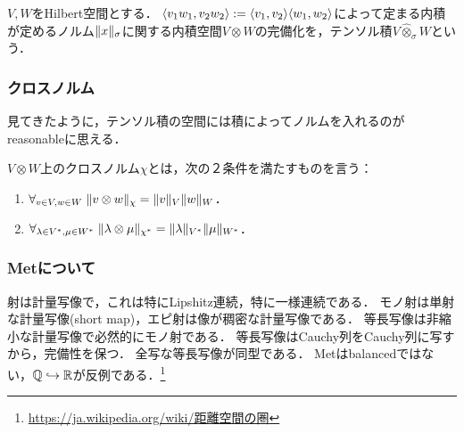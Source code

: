 \documentclass[uplatex,dvipdfmx]{jsreport}
\begin{document}
\begin{definition}
    $V,W$をHilbert空間とする．
    $\langle v_1w_1,v_2w_2\rangle:=\langle v_1,v_2\rangle\langle w_1,w_2\rangle$によって定まる内積が定めるノルム$\|x\|_\sigma$に関する内積空間$V\otimes W$の完備化を，テンソル積$V\hat{\otimes}_\sigma W$という．
\end{definition}

\subsubsection{クロスノルム}

\begin{tcolorbox}[colframe=ForestGreen, colback=ForestGreen!10!white,breakable,colbacktitle=ForestGreen!40!white,coltitle=black,fonttitle=\bfseries\sffamily,
title=]
    見てきたように，テンソル積の空間には積によってノルムを入れるのがreasonableに思える．
\end{tcolorbox}

\begin{definition}
    $V\otimes W$上のクロスノルム$\chi$とは，次の２条件を満たすものを言う：
    \begin{enumerate}
        \item $\forall_{v\in V,w\in W}\;\|v\otimes w\|_\chi=\|v\|_V\|w\|_W$．
        \item $\forall_{\lambda\in V^*,\mu\in W^*}\;\|\lambda\otimes\mu\|_{\chi^*}=\|\lambda\|_{V^*}\|\mu\|_{W^*}$．
    \end{enumerate}
\end{definition}

\subsubsection{Metについて}

\begin{tcolorbox}[colframe=ForestGreen, colback=ForestGreen!10!white,breakable,colbacktitle=ForestGreen!40!white,coltitle=black,fonttitle=\bfseries\sffamily,
title=]
    射は計量写像で，これは特にLipshitz連続，特に一様連続である．
    モノ射は単射な計量写像(short map)，エピ射は像が稠密な計量写像である．
    等長写像は非縮小な計量写像で必然的にモノ射である．
    等長写像はCauchy列をCauchy列に写すから，完備性を保つ．
    全写な等長写像が同型である．
    Metはbalancedではない，$\mathbb{Q}\hookrightarrow\mathbb{R}$が反例である．\footnote{\url{https://ja.wikipedia.org/wiki/距離空間の圏}}
\end{tcolorbox}
\end{document}
